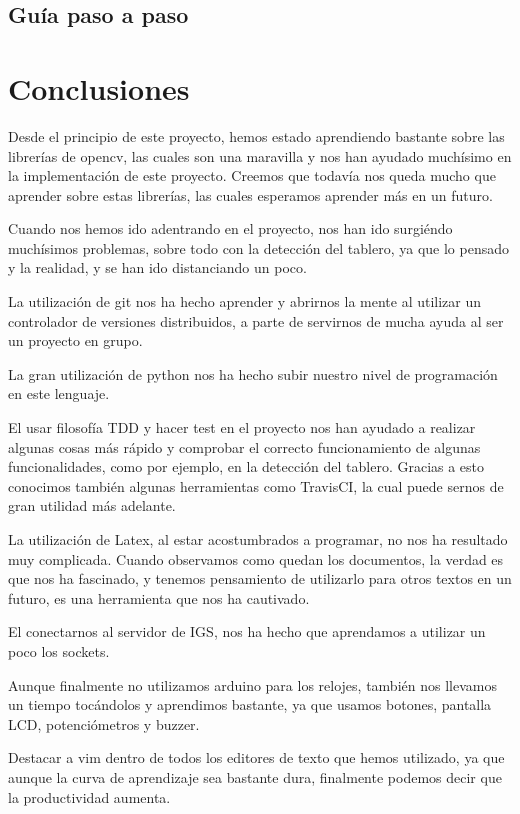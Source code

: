 \documentclass[12pt,a4paper]{report}
\begin{document}
\section{Guía paso a paso}


\chapter{Conclusiones}

Desde el principio de este proyecto, hemos estado aprendiendo bastante sobre las
librerías de opencv, las cuales son una maravilla y nos han ayudado muchísimo en
la implementación de este proyecto. Creemos que todavía nos queda mucho que
aprender sobre estas librerías, las cuales esperamos aprender más en un futuro. 

Cuando nos hemos ido adentrando en el proyecto, nos han ido surgiéndo muchísimos
problemas, sobre todo con la detección del tablero, ya que lo pensado y la
realidad, y se han ido distanciando un poco. 

La utilización de git nos ha hecho aprender y abrirnos la mente al utilizar un
controlador de versiones distribuidos, a parte de servirnos de mucha ayuda al
ser un proyecto en grupo. 

La gran utilización de python nos ha hecho subir nuestro nivel de programación
en este lenguaje.

El usar filosofía TDD y hacer test en el proyecto nos han ayudado a realizar
algunas cosas más rápido y comprobar el correcto funcionamiento de algunas
funcionalidades, como por ejemplo, en la detección del tablero. Gracias a esto
conocimos también algunas herramientas como TravisCI, la cual puede sernos de
gran utilidad más adelante. 

La utilización de Latex, al estar acostumbrados a programar, no nos ha resultado
muy complicada. Cuando observamos como quedan los documentos, la verdad es que
nos ha fascinado, y tenemos pensamiento de utilizarlo para otros textos en un
futuro, es una herramienta que nos ha cautivado.

El conectarnos al servidor de IGS, nos ha hecho que aprendamos a utilizar un
poco los sockets.

Aunque finalmente no utilizamos arduino para los relojes, también nos llevamos
un tiempo tocándolos y aprendimos bastante, ya que usamos botones, pantalla
LCD, potenciómetros y buzzer.

Destacar a vim dentro de todos los editores de texto que hemos utilizado, ya que
aunque la curva de aprendizaje sea bastante dura, finalmente podemos decir que
la productividad aumenta. 
\end{document}

